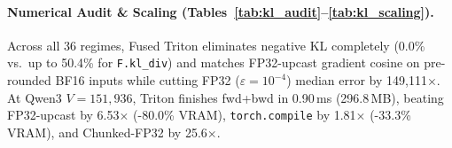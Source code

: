 \documentclass[10pt,twocolumn]{article}
\begin{document}
\begin{table}[t]
  \centering
  \caption{Real 200-step 3-seed BF16 RLHF on Qwen3-1.7B ($V=151{{,}}936, \beta=2.0$, trainable top-4 blocks + rank-16 LoRA + full LM head, 512 real tokens/step).}
  \label{tab:kl_qwen200}
  \scriptsize
\end{table}


\paragraph{Numerical Audit \& Scaling (Tables~\ref{tab:kl_audit}--\ref{tab:kl_scaling}).} Across all 36 regimes, Fused Triton eliminates negative KL completely (0.0\% vs.\ up to 50.4\% for \texttt{F.kl\_div}) and matches FP32-upcast gradient cosine on pre-rounded BF16 inputs while cutting FP32 ($\varepsilon=10^{-4}$) median error by 149,111$\times$. At Qwen3 $V=151{,}936$, Triton finishes fwd+bwd in 0.90\,ms (296.8\,MB), beating FP32-upcast by 6.53$\times$ (-80.0\% VRAM), \texttt{torch.compile} by 1.81$\times$ (-33.3\% VRAM), and Chunked-FP32 by 25.6$\times$.
\end{document}
